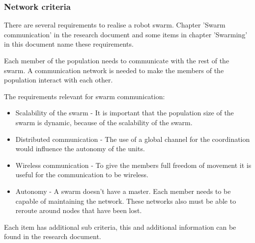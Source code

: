\documentclass[10pt,a4paper]{article}
\begin{document}
\subsubsection{Network criteria}
There are several requirements to realise a robot swarm. Chapter 'Swarm communication' in the research document and some items in chapter 'Swarming' in this document name these requirements. 

Each member of the population needs to communicate with the rest of the swarm. A communication network is needed to make the members of the population interact with each other.

The requirements relevant for swarm communication:
\begin{itemize}
\setlength\itemsep{0em}
    \item Scalability of the swarm - It is important that the population size of the swarm is
    dynamic, because of the scalability of the swarm.
    \item Distributed communication - The use of a global channel for the coordination would influence the autonomy of the units.\cite{swarmintelligence}
    \item Wireless communication - To give the members full freedom of movement it is useful for the   communication to be wireless.
    \item Autonomy - A swarm doesn't have a master. Each member needs to be capable of maintaining the  network. These networks also must be able to reroute around nodes that have
    been lost.
\end{itemize}
Each item has additional sub criteria, this and additional information can be found in the research document.
\end{document}
